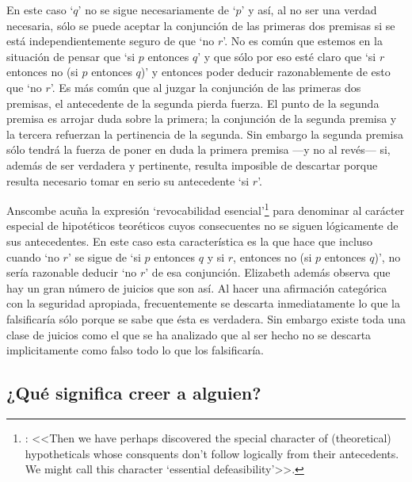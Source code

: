   En este caso `$q$' no se sigue necesariamente de `$p$' y así, al no ser una
  verdad necesaria, sólo se puede aceptar la conjunción de las primeras dos
  premisas si se está independientemente seguro de que `no $r$'. No es común que
  estemos en la situación de pensar que `si $p$ entonces $q$' y que sólo por eso
  esté claro que `si $r$ entonces no (si $p$ entonces $q$)' y entonces poder
  deducir razonablemente de esto que `no $r$'. Es más común que al juzgar la
  conjunción de las primeras dos premisas, el antecedente de la segunda pierda
  fuerza. El punto de la segunda premisa es arrojar duda sobre la primera; la
  conjunción de la segunda premisa y la tercera refuerzan la pertinencia de la
  segunda. Sin embargo la segunda premisa sólo tendrá la fuerza de poner en duda
  la primera premisa ---y no al revés--- si, además de ser verdadera y
  pertinente, resulta imposible de descartar porque resulta necesario tomar en
  serio su antecedente `si $r$'\autocite[Cf.~][301]{anscombe2015logic:qpa}.

  Anscombe acuña la expresión `revocabilidad
  esencial'\footnote{\cite[Cf.~][301]{anscombe2015logic:qpa}: <<Then we have
    perhaps discovered the special character of (theoretical) hypotheticals
    whose consquents don't follow logically from their antecedents. We might
    call this character `essential defeasibility'>>.} para denominar al carácter
  especial de hipotéticos teoréticos cuyos consecuentes no se siguen lógicamente
  de sus antecedentes. En este caso esta característica es la que hace que
  incluso cuando `no $r$' se sigue de `si $p$ entonces $q$ y si $r$, entonces no
  (si $p$ entonces $q$)', no sería razonable deducir `no $r$' de esa conjunción.
  Elizabeth además observa que hay un gran número de juicios que son así. Al
  hacer una afirmación categórica con la seguridad apropiada, frecuentemente se
  descarta inmediatamente lo que la falsificaría sólo porque se sabe que ésta es
  verdadera. Sin embargo existe toda una clase de juicios como el que se ha
  analizado que al ser hecho no se descarta implicitamente como falso todo lo
  que los falsificaría\autocite[Cf.~][302]{anscombe2015logic:qpa}.

\subsection{¿Qué significa creer a alguien?}
